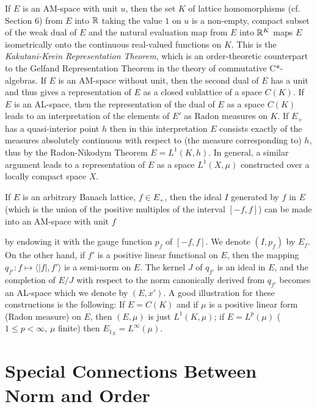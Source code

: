 If $ E $ is an AM-space with unit $ u $, then the set $ K $ of lattice homomorphisms (cf. Section 6) from $ E $ into $ \mathbb{R} $ taking the value $ 1 $ on $ u $ is a non-empty, compact subset of the weak dual of $ E $ and the natural evaluation map from $ E $ into $ \mathbb{R}^{K} $ maps $ E $ isometrically onto the continuous real-valued functions on $ K $.
This is the \emph{Kakutani-Krein Representation Theorem}, which is an order-theoretic counterpart to the Gelfand Representation Theorem in the theory of commutative C*-algebras.
If $ E $ is an AM-space without unit, then the second dual of $ E $ has a unit and thus gives a representation of $ E $ as a closed sublattice of a space $ C(K) $.
If $ E $ is an AL-space, then the representation of the dual of $ E $ as a space $ C(K) $ leads to an interpretation of the elements of $ E' $ as Radon measures on $ K $.
If $ E_{+} $ has a quasi-interior point $ h $ then in this interpretation $ E $ consists exactly of the measures absolutely continuous with respect to (the measure corresponding to) $ h $, thus by the Radon-Nikodym Theorem $ E = L^{1}(K,h) $.
In general, a similar argument leads to a representation of $ E $ as a space $ L^{1}(X,\mu) $ constructed over a locally compact space $ X $.

If $ E $ is an arbitrary Banach lattice, $ f \in E_{+} $, then the ideal $ I $ generated by $ f $ in $ E $ (which is the union of the positive multiples of the interval $ [-f,f] $) can be made into an AM-space with unit $ f $



\pagebreak

by endowing it with the gauge function $ p_{f} $ of $ [-f,f] $.
We denote $ (I,p_{f}) $ by $ E_{f} $.
On the other hand, if $ f' $ is a positive linear functional on $ E $, then the mapping $ q_{f'} \colon f \mapsto \langle |f|,f'\rangle $ is a semi-norm on $ E $.
The kernel $ J $ of $ q_{f'} $ is an ideal in $ E $, and the completion of $ E/J $ with respect to the norm canonically derived from $ q_{f'} $ becomes an AL-space which we denote by $ (E,x') $.
A good illustration for these constructions is the following:
If $ E = C(K) $ and if $ \mu $ is a positive linear form (Radon measure) on $ E $, then $ (E,\mu) $ is just $ L^{1}(K,\mu) $;
if $ E = L^{p}(\mu) $ ($ 1 \leq p < \infty $, $ \mu $ finite) then $ E_{1_{X}} = L^{\infty}(\mu) $.

\section{Special Connections Between Norm and Order}\label{sec:c1-5}

